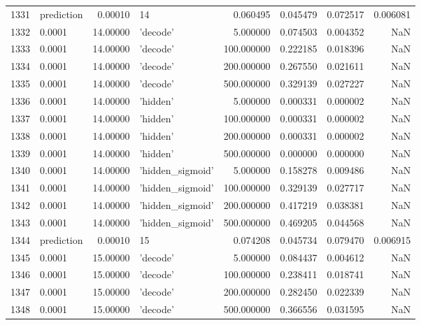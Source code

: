 \documentclass[10pt,a4paper]{article}
\begin{document}
\begin{tabular}{llrlrrrr}
1331 &  prediction &   0.00010 &                 14 &    0.060495 &  0.045479 &  0.072517 &  0.006081 \\
1332 &      0.0001 &  14.00000 &           'decode' &    5.000000 &  0.074503 &  0.004352 &       NaN \\
1333 &      0.0001 &  14.00000 &           'decode' &  100.000000 &  0.222185 &  0.018396 &       NaN \\
1334 &      0.0001 &  14.00000 &           'decode' &  200.000000 &  0.267550 &  0.021611 &       NaN \\
1335 &      0.0001 &  14.00000 &           'decode' &  500.000000 &  0.329139 &  0.027227 &       NaN \\
1336 &      0.0001 &  14.00000 &           'hidden' &    5.000000 &  0.000331 &  0.000002 &       NaN \\
1337 &      0.0001 &  14.00000 &           'hidden' &  100.000000 &  0.000331 &  0.000002 &       NaN \\
1338 &      0.0001 &  14.00000 &           'hidden' &  200.000000 &  0.000331 &  0.000002 &       NaN \\
1339 &      0.0001 &  14.00000 &           'hidden' &  500.000000 &  0.000000 &  0.000000 &       NaN \\
1340 &      0.0001 &  14.00000 &   'hidden\_sigmoid' &    5.000000 &  0.158278 &  0.009486 &       NaN \\
1341 &      0.0001 &  14.00000 &   'hidden\_sigmoid' &  100.000000 &  0.329139 &  0.027717 &       NaN \\
1342 &      0.0001 &  14.00000 &   'hidden\_sigmoid' &  200.000000 &  0.417219 &  0.038381 &       NaN \\
1343 &      0.0001 &  14.00000 &   'hidden\_sigmoid' &  500.000000 &  0.469205 &  0.044568 &       NaN \\
1344 &  prediction &   0.00010 &                 15 &    0.074208 &  0.045734 &  0.079470 &  0.006915 \\
1345 &      0.0001 &  15.00000 &           'decode' &    5.000000 &  0.084437 &  0.004612 &       NaN \\
1346 &      0.0001 &  15.00000 &           'decode' &  100.000000 &  0.238411 &  0.018741 &       NaN \\
1347 &      0.0001 &  15.00000 &           'decode' &  200.000000 &  0.282450 &  0.022339 &       NaN \\
1348 &      0.0001 &  15.00000 &           'decode' &  500.000000 &  0.366556 &  0.031595 &       NaN \\

\end{tabular}
\end{document}
